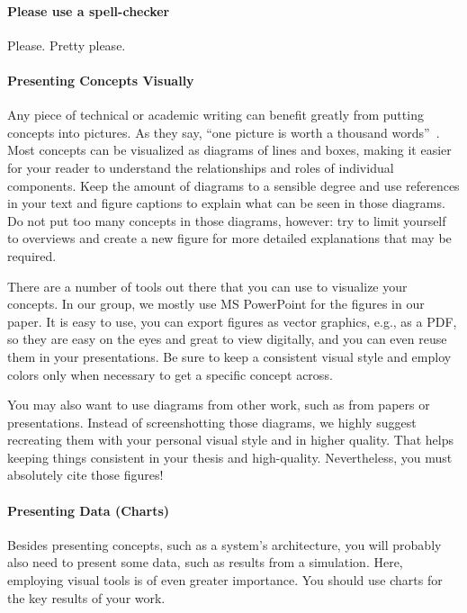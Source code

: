 \documentclass[a4paper]{article}
\begin{document}
\paragraph{Please use a spell-checker}
Please.
Pretty please.

\paragraph{Presenting Concepts Visually} \label{sec:diagrams}

Any piece of technical or academic writing can benefit greatly from putting concepts into pictures.
As they say, ``one picture is worth a thousand words''~\cite{thousandwords}.
Most concepts can be visualized as diagrams of lines and boxes, making it easier for your reader to understand the relationships and roles of individual components.
Keep the amount of diagrams to a sensible degree and use references in your text and figure captions to explain what can be seen in those diagrams.
Do not put too many concepts in those diagrams, however: try to limit yourself to overviews and create a new figure for more detailed explanations that may be required.

There are a number of tools out there that you can use to visualize your concepts.
In our group, we mostly use MS PowerPoint for the figures in our paper.
It is easy to use, you can export figures as vector graphics, e.g., as a PDF, so they are easy on the eyes and great to view digitally, and you can even reuse them in your presentations.
Be sure to keep a consistent visual style and employ colors only when necessary to get a specific concept across.

You may also want to use diagrams from other work, such as from papers or presentations.
Instead of screenshotting those diagrams, we highly suggest recreating them with your personal visual style and in higher quality.
That helps keeping things consistent in your thesis and high-quality.
Nevertheless, you must absolutely cite those figures!

\paragraph{Presenting Data (Charts)}

Besides presenting concepts, such as a system's architecture, you will probably also need to present some data, such as results from a simulation.
Here, employing visual tools is of even greater importance.
You should use charts for the key results of your work.
\end{document}
